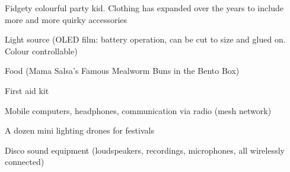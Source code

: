 \newpage
\begin{npcBox}[title=Disco continued]
    \begin{npcDescription}
    Fidgety colourful party kid. Clothing has expanded over the years to include more and more quirky accessories
    \end{npcDescription}


    \begin{equipment}
    \item Light source (OLED film: battery operation, can be cut to size and glued on. Colour controllable)
    \item Food (Mama Salsa's Famous Mealworm Buns in the Bento Box)
    \item First aid kit
    \item Mobile computers, headphones, communication via radio (mesh network)
    \item A dozen mini lighting drones for festivals
    \item Disco sound equipment (loudspeakers, recordings, microphones, all wirelessly connected)
    \end{equipment}
\end{npcBox}


